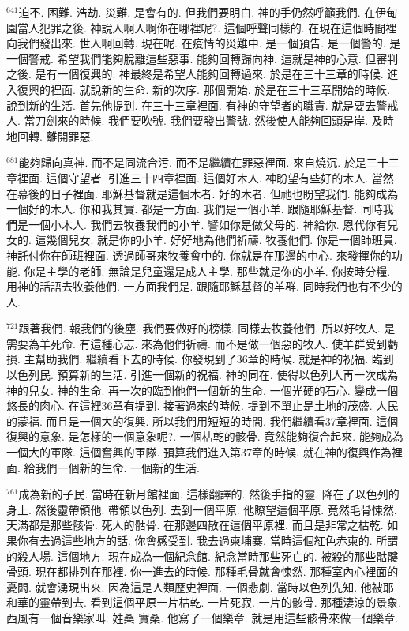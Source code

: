 \documentclass{book}
\begin{document}
$^{641}$迫不.
困難.
浩劫.
災難.
是會有的.
但我們要明白.
神的手仍然呼籲我們.
在伊甸園當人犯罪之後.
神說人啊人啊你在哪裡呢?.
這個呼聲同樣的.
在現在這個時間裡向我們發出來.
世人啊回轉.
現在呢.
在疫情的災難中.
是一個預告.
是一個警的.
是一個警戒.
希望我們能夠脫離這些惡事.
能夠回轉歸向神.
這就是神的心意.
但審判之後.
是有一個復興的.
神最終是希望人能夠回轉過來.
於是在三十三章的時候.
進入復興的裡面.
就說新的生命.
新的次序.
那個開始.
於是在三十三章開始的時候.
說到新的生活.
首先他提到.
在三十三章裡面.
有神的守望者的職責.
就是要去警戒人.
當刀劍來的時候.
我們要吹號.
我們要發出警號.
然後使人能夠回頭是岸.
及時地回轉.
離開罪惡.

$^{681}$能夠歸向真神.
而不是同流合污.
而不是繼續在罪惡裡面.
來自燒沉.
於是三十三章裡面.
這個守望者.
引進三十四章裡面.
這個好木人.
神盼望有些好的木人.
當然在幕後的日子裡面.
耶穌基督就是這個木者.
好的木者.
但祂也盼望我們.
能夠成為一個好的木人.
你和我其實.
都是一方面.
我們是一個小羊.
跟隨耶穌基督.
同時我們是一個小木人.
我們去牧養我們的小羊.
譬如你是做父母的.
神給你.
恩代你有兒女的.
這幾個兒女.
就是你的小羊.
好好地為他們祈禱.
牧養他們.
你是一個師班員.
神託付你在師班裡面.
透過師哥來牧養會中的.
你就是在那邊的中心.
來發揮你的功能.
你是主學的老師.
無論是兒童還是成人主學.
那些就是你的小羊.
你按時分糧.
用神的話語去牧養他們.
一方面我們是.
跟隨耶穌基督的羊群.
同時我們也有不少的人.

$^{721}$跟著我們.
報我們的後塵.
我們要做好的榜樣.
同樣去牧養他們.
所以好牧人.
是需要為羊死命.
有這種心志.
來為他們祈禱.
而不是做一個惡的牧人.
使羊群受到虧損.
主幫助我們.
繼續看下去的時候.
你發現到了36章的時候.
就是神的祝福.
臨到以色列民.
預算新的生活.
引進一個新的祝福.
神的同在.
使得以色列人再一次成為神的兒女.
神的生命.
再一次的臨到他們一個新的生命.
一個光硬的石心.
變成一個悠長的肉心.
在這裡36章有提到.
接著過來的時候.
提到不單止是土地的茂盛.
人民的蒙福.
而且是一個大的復興.
所以我們用短短的時間.
我們繼續看37章裡面.
這個復興的意象.
是怎樣的一個意象呢?.
一個枯乾的骸骨.
竟然能夠復合起來.
能夠成為一個大的軍隊.
這個奮興的軍隊.
預算我們進入第37章的時候.
就在神的復興作為裡面.
給我們一個新的生命.
一個新的生活.

$^{761}$成為新的子民.
當時在新月館裡面.
這樣翻譯的.
然後手指的靈.
降在了以色列的身上.
然後靈帶領他.
帶領以色列.
去到一個平原.
他瞭望這個平原.
竟然毛骨悚然.
天滿都是那些骸骨.
死人的骷骨.
在那邊四散在這個平原裡.
而且是非常之枯乾.
如果你有去過這些地方的話.
你會感受到.
我去過柬埔寨.
當時這個紅色赤柬的.
所謂的殺人場.
這個地方.
現在成為一個紀念館.
紀念當時那些死亡的.
被殺的那些骷髏骨頭.
現在都排列在那裡.
你一進去的時候.
那種毛骨就會悚然.
那種室內心裡面的憂悶.
就會湧現出來.
因為這是人類歷史裡面.
一個悲劇.
當時以色列先知.
他被耶和華的靈帶到去.
看到這個平原一片枯乾.
一片死寂.
一片的骸骨.
那種淒涼的景象.
西風有一個音樂家叫.
姓桑 實桑.
他寫了一個樂章.
就是用這些骸骨來做一個樂章.
\end{document}
